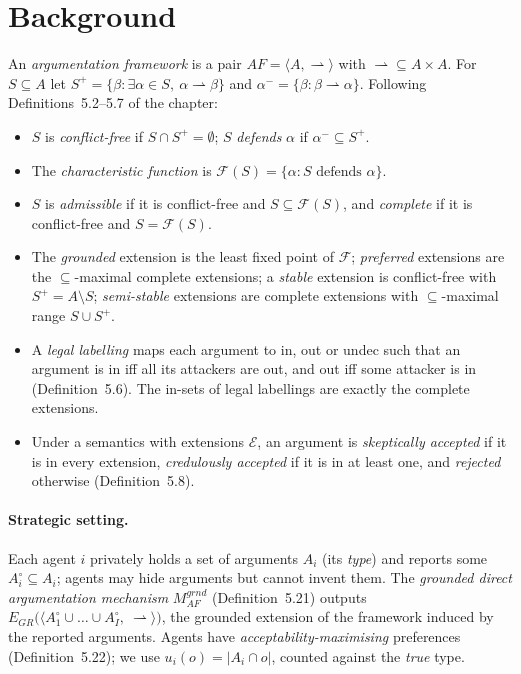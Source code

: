 \documentclass[11pt,a4paper]{article}
\newcommand{\att}{\rightharpoonup}
\newcommand{\AF}{\mathit{AF}}
\newcommand{\Mgr}{M^{\mathit{grnd}}_{\AF}}
\newcommand{\EGR}{E_{\mathit{GR}}}
\theoremstyle{definition}
\begin{document}
\section{Background}\label{sec:background}

An \emph{argumentation framework} is a pair $\AF=\langle A,\att\rangle$ with $\att\subseteq A\times A$.
For $S\subseteq A$ let $S^+=\{\beta : \exists\alpha\in S,\ \alpha\att\beta\}$ and
$\alpha^-=\{\beta:\beta\att\alpha\}$. Following Definitions~5.2--5.7 of the chapter:
\begin{itemize}
  \item $S$ is \emph{conflict-free} if $S\cap S^+=\emptyset$; $S$ \emph{defends} $\alpha$ if
        $\alpha^-\subseteq S^+$.
  \item The \emph{characteristic function} is $\mathcal F(S)=\{\alpha : S \text{ defends } \alpha\}$.
  \item $S$ is \emph{admissible} if it is conflict-free and $S\subseteq\mathcal F(S)$, and
        \emph{complete} if it is conflict-free and $S=\mathcal F(S)$.
  \item The \emph{grounded} extension is the least fixed point of $\mathcal F$; \emph{preferred}
        extensions are the $\subseteq$-maximal complete extensions; a \emph{stable} extension is
        conflict-free with $S^+=A\setminus S$; \emph{semi-stable} extensions are complete extensions
        with $\subseteq$-maximal range $S\cup S^+$.
  \item A \emph{legal labelling} maps each argument to \textsf{in}, \textsf{out} or \textsf{undec}
        such that an argument is \textsf{in} iff all its attackers are \textsf{out}, and \textsf{out}
        iff some attacker is \textsf{in} (Definition~5.6). The \textsf{in}-sets of legal labellings
        are exactly the complete extensions.
  \item Under a semantics with extensions $\mathcal E$, an argument is \emph{skeptically accepted}
        if it is in every extension, \emph{credulously accepted} if it is in at least one, and
        \emph{rejected} otherwise (Definition~5.8).
\end{itemize}

\paragraph{Strategic setting.} Each agent $i$ privately holds a set of arguments $A_i$ (its
\emph{type}) and reports some $A_i^\circ\subseteq A_i$; agents may hide arguments but cannot invent
them. The \emph{grounded direct argumentation mechanism} $\Mgr$ (Definition~5.21) outputs
$\EGR\bigl(\langle A_1^\circ\cup\dots\cup A_I^\circ,\ \att\rangle\bigr)$, the grounded extension of the
framework induced by the reported arguments. Agents have \emph{acceptability-maximising} preferences
(Definition~5.22); we use $u_i(o)=|A_i\cap o|$, counted against the \emph{true} type.
\end{document}
